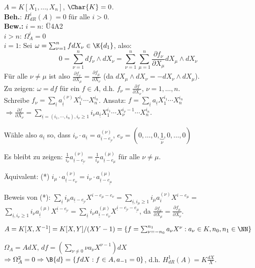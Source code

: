 \begin{nnBsp}
$A=K[X_1, \ldots, X_n]$, $\Char{K}=0$.\\
\textbf{Beh.}: $H_{dR}^i(A) = 0$ f\"ur alle $i>0$.\\
\textbf{Bew.: } $i=n$: \"U4A2\\
$i>n$: $\Omega_A^i=0$\\
$i=1$: Sei $\omega=\sum_{\nu=1}^nf dX_\nu\in \K{d_1}$, also:
\[
0=\sum_{\nu=1}^n df_\nu \wedge dX_\nu=\sum_{\nu=1}^n \sum_{\mu=1}^n
\frac{\partial f_\nu}{\partial X_\mu}dX_\mu\wedge dX_\nu
\]
F\"ur alle $\nu\neq \mu$ ist also $\frac{\partial f_\nu}{\partial X_\mu}=\frac{\partial f_\mu}{\partial X_\nu}$
(da $dX_\mu\wedge dX_\nu = -dX_\nu\wedge dX_\mu$).\\
Zu zeigen: $\omega = df$ f\"ur ein $f\in A$, d.h. $f_\nu=\frac{\partial f}{\partial X_\nu}$, $\nu=1, \ldots, n$.\\
Schreibe $f_\nu=\sum_{\underline{i}} a_{\underline{i}}^{(\nu)}X_1^{i_1}\cdots X_n^{i_n}$.
Ansatz: $f=\sum_{\underline{i}} a_{\underline{i}} X_1^{i_1}\cdots X_n^{i_n}$
$\Rightarrow \frac{\partial f}{\partial X_\nu}
=\sum_{\underline{i}=(i_1, \cdots, i_n), i_\nu\geq 1}i_\nu a_{\underline{i}}
X_1^{i_1}\cdots X_\nu^{i_\nu-1} \cdots X_n^{i_n}$.

W\"ahle also $a_{\underline{i}}$ so, dass $i_\nu\cdot a_{\underline{i}} = a_{\underline{i}-\underline{e_\nu}}^{(\nu)}$,
$e_\nu=(0,\ldots,0,\underbrace{1}_{\nu},0,\ldots, 0)$

Es bleibt zu zeigen: $\frac{1}{i_\nu} a_{\underline{i}-\underline{e_\nu}}^{(\nu)}
=\frac{1}{i_\mu} a_{\underline{i}-e_\mu}^{(\mu)}$ f\"ur alle $\nu\neq \mu$.

\"Aquivalent: (*) $i_\mu\cdot a_{\underline{i}-e_{\nu}}^{(\nu)}=i_\nu \cdot a_{\underline{i}-\underline{e_\mu}}^{(\mu)}$

Beweis von (*): $
\sum_{\underline{i}} i_\mu a_{\underline{i}-\underline{e_\nu}}X^{i-e_\mu-e_\nu}
= \sum_{\underline{i}, i_\mu\geq 1} i_\mu a_{i}^{(\nu)} X^{i-e_\mu}=$\\
$\sum_{\underline{i}, i_\nu\geq 1}i_\nu a_{\underline{i}}^{(\mu)}X^{\underline{i}-\underline{e_\nu}}
= \sum_{\underline{i}} i_\nu a_{\underline{i}-e_\nu}^{(\mu)}X^{\underline{i}-\underline{e_\nu}-\underline{e_\mu}}$,
da $\frac{\partial f_\nu}{\partial X_\mu} = \frac{\partial f_\mu}{\partial X_\nu}$.
\end{nnBsp}

\begin{nnBsp}
$A=K[X, X^{-1}]=K[X,Y]/(XY-1)=\{f=\sum_{\nu=-n_0}^{n_1} a_\nu X^\nu: a_\nu\in K, n_0, n_1\in \NN\}$

$\Omega_A=AdX$, $df=(\sum_{\nu\neq 0}\nu a_\nu X^{\nu-1})dX$
$\Rightarrow \Omega_A^2 = 0 \Rightarrow \B{d}=\{fdX:f\in A, a_{-1}=0\}$,
d.h. $H_{dR}^{1}(A) = K\frac{dX}{X}$.
\end{nnBsp}
